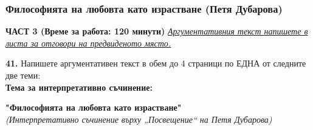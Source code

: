 \documentclass[12pt,a4paper]{article}
\begin{document}
\subsubsection{Философията на любовта като израстване (Петя Дубарова)}
\vspace{0.5cm}
\begin{center}
\textbf{ЧАСТ 3 (Време за работа: 120 минути)}
\vspace{0.2cm}
{\textit{\underline{Аргументативния текст напишете в листа за отговори на предвиденото място.}}}
\vspace{0.1cm}
\end{center}
\textbf{41.} Напишете аргументативен текст в обем до 4 страници по ЕДНА от следните две теми:
\\
\vspace{0.2cm}
\textbf{Тема за интерпретативно съчинение:}
\vspace{0.1cm}
\begin{center}
\textbf{"Философията на любовта като израстване"}
\\
\textit{(Интерпретативно съчинение върху „Посвещение“ на Петя Дубарова)}
\end{center}
\end{document}
